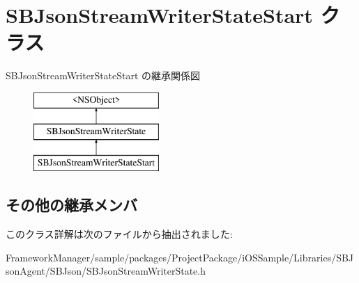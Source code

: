 \hypertarget{interface_s_b_json_stream_writer_state_start}{}\section{S\+B\+Json\+Stream\+Writer\+State\+Start クラス}
\label{interface_s_b_json_stream_writer_state_start}
S\+B\+Json\+Stream\+Writer\+State\+Start の継承関係図\begin{figure}[H]
\begin{center}
\leavevmode
\includegraphics[height=3.000000cm]{interface_s_b_json_stream_writer_state_start}
\end{center}
\end{figure}
\subsection*{その他の継承メンバ}


このクラス詳解は次のファイルから抽出されました\+:\begin{DoxyCompactItemize}
\item 
Framework\+Manager/sample/packages/\+Project\+Package/i\+O\+S\+Sample/\+Libraries/\+S\+B\+Json\+Agent/\+S\+B\+Json/S\+B\+Json\+Stream\+Writer\+State.\+h\end{DoxyCompactItemize}
